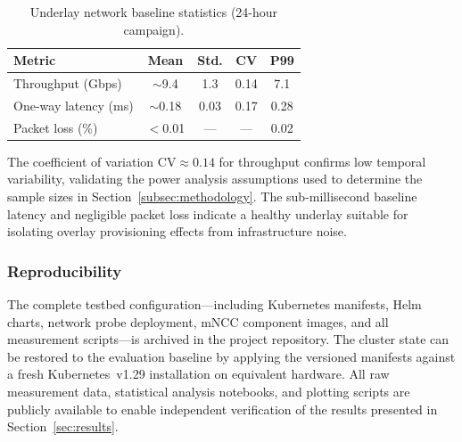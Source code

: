 \begin{table}[htbp]
  \centering
  \caption{Underlay network baseline statistics (24-hour campaign).}
  \label{tab:stats}
  \begin{tabular}{lcccc}
    \toprule
    \textbf{Metric} & \textbf{Mean} & \textbf{Std.} & \textbf{CV} & \textbf{P99} \\
    \midrule
    Throughput (Gbps)     & $\sim$9.4  & 1.3  & 0.14 & 7.1 \\
    One-way latency (ms)  & $\sim$0.18 & 0.03 & 0.17 & 0.28 \\
    Packet loss (\%)      & $<$0.01    & ---  & ---  & 0.02 \\
    \bottomrule
  \end{tabular}
\end{table}

The coefficient of variation $\mathrm{CV} \approx 0.14$ for
throughput confirms low temporal variability, validating the
power analysis assumptions used to determine the sample sizes
in Section~\ref{subsec:methodology}.
The sub-millisecond baseline latency and negligible packet loss
indicate a healthy underlay suitable for isolating overlay
provisioning effects from infrastructure noise.

\subsubsection{Reproducibility}
\label{subsubsec:reproducibility}

The complete testbed configuration---including Kubernetes manifests,
Helm charts, network probe deployment, mNCC component images, and
all measurement scripts---is archived in the project repository.
The cluster state can be restored to the evaluation baseline by
applying the versioned manifests against a fresh Kubernetes~v1.29
installation on equivalent hardware.
All raw measurement data, statistical analysis notebooks, and
plotting scripts are publicly available to enable independent
verification of the results presented in
Section~\ref{sec:results}.
